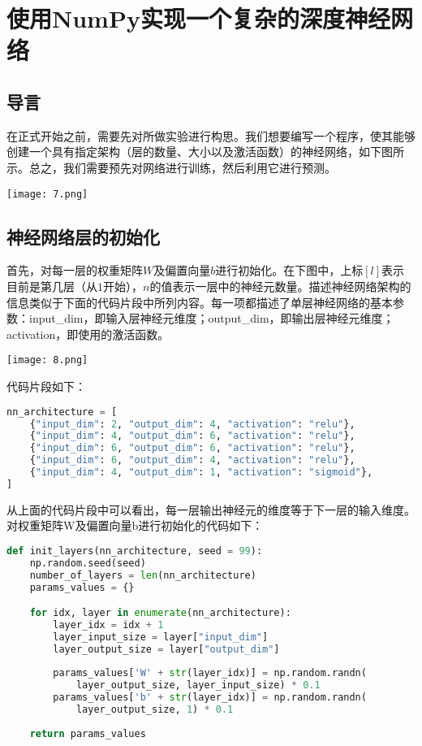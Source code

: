 \chapter{使用NumPy实现一个复杂的深度神经网络}

\section{导言}

在正式开始之前，需要先对所做实验进行构思。我们想要编写一个程序，使其能够创建一个具有指定架构（层的数量、大小以及激活函数）的神经网络，如下图所示。总之，我们需要预先对网络进行训练，然后利用它进行预测。

\noindent\texttt{[image: 7.png]}

\section{神经网络层的初始化}

首先，对每一层的权重矩阵$W$及偏置向量$b$进行初始化。在下图中，上标$[l]$表示目前是第几层（从$1$开始），$n$的值表示一层中的神经元数量。描述神经网络架构的信息类似于下面的代码片段中所列内容。每一项都描述了单层神经网络的基本参数：input\_dim，即输入层神经元维度；output\_dim，即输出层神经元维度；activation，即使用的激活函数。

\noindent\texttt{[image: 8.png]}

代码片段如下：

\begin{lstlisting}[language=python, breaklines]
nn_architecture = [
    {"input_dim": 2, "output_dim": 4, "activation": "relu"},
    {"input_dim": 4, "output_dim": 6, "activation": "relu"},
    {"input_dim": 6, "output_dim": 6, "activation": "relu"},
    {"input_dim": 6, "output_dim": 4, "activation": "relu"},
    {"input_dim": 4, "output_dim": 1, "activation": "sigmoid"},
]
\end{lstlisting}

从上面的代码片段中可以看出，每一层输出神经元的维度等于下一层的输入维度。对权重矩阵W及偏置向量b进行初始化的代码如下：

\begin{lstlisting}[language=python, breaklines]
def init_layers(nn_architecture, seed = 99):
    np.random.seed(seed)
    number_of_layers = len(nn_architecture)
    params_values = {}

    for idx, layer in enumerate(nn_architecture):
        layer_idx = idx + 1
        layer_input_size = layer["input_dim"]
        layer_output_size = layer["output_dim"]
        
        params_values['W' + str(layer_idx)] = np.random.randn(
            layer_output_size, layer_input_size) * 0.1
        params_values['b' + str(layer_idx)] = np.random.randn(
            layer_output_size, 1) * 0.1
        
    return params_values
\end{lstlisting}

